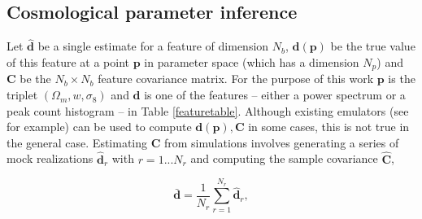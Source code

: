 \documentclass[reprint,aps,prd,superscriptaddress,showkeys,showpacs]{revtex4-1}
\newcommand{\bb}[1]{\mathbf{#1}}
\newcommand{\bbh}[1]{\mathbf{\hat{#1}}}
\begin{document}
\subsection{Cosmological parameter inference}
%
Let $\bbh{d}$ be a single estimate for a feature of dimension $N_b$, 
$\bb{d}(\bb{p})$ be the
true value of this feature at a point $\bb{p}$ in parameter space
(which has a dimension $N_p$) and $\bb{C}$ be the $N_b\times N_b$
feature covariance matrix. For the purpose of this work $\bb{p}$ is
the triplet $(\Omega_m,w,\sigma_8)$ and $\bb{d}$ is one of the
features -- either a power spectrum or a peak count histogram -- in Table
\ref{featuretable}. Although existing emulators (see
\citep{coyote2,Nicaea,SchneiderKnoxCovariance} for example) can be used to compute $\bb{d}(\bb{p}),\bb{C}$ in some cases, this is not true in the general case. 
Estimating $\bb{C}$ from simulations involves generating a series of mock realizations $\bbh{d}_r$ with $r=1...N_r$ and computing the
sample covariance $\bbh{C}$,

\begin{equation}
\bb{\bar{d}} = \frac{1}{N_r}\sum_{r=1}^{N_r} \bbh{d}_r,
\end{equation}
\end{document}
